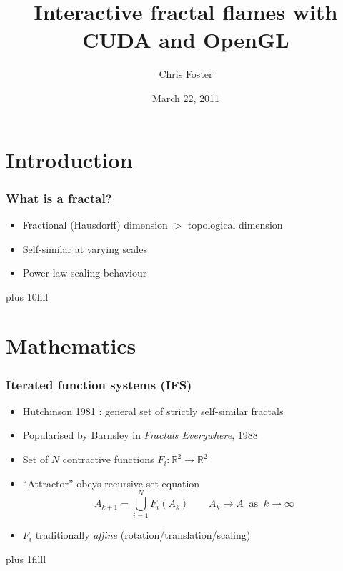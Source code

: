 \documentclass{beamer}
\title[Interactive fractal flames]{Interactive fractal flames with CUDA and OpenGL}
\author{Chris Foster}
\institute{ROAMES}
\date{March 22, 2011}
\newcommand{\vf}[1]{\vskip0pt plus #1}
\begin{document}
\begin{frame}[plain]
  \titlepage
\end{frame}



\section{Introduction}

\begin{frame}
  \frametitle{What is a fractal?}
  \begin{itemize}
    \item<1>
      Fractional (Hausdorff) dimension $>$ topological dimension
    \item<2>
      Self-similar at varying scales
    \item<3>
      Power law scaling behaviour
  \end{itemize}
  \vf{10fill}
\end{frame}



\section{Mathematics}

\begin{frame}
  \frametitle{Iterated function systems (IFS)}
  \begin{itemize}
    \item
      Hutchinson 1981 \cite{Hutchinson1981}: general set of strictly 
      self-similar fractals
    \item
      Popularised by Barnsley \cite{Barnsley1988} in \emph{Fractals Everywhere}, 1988
    \item
      Set of $N$ contractive functions $F_i \colon \mathbb{R}^2\to\mathbb{R}^2$
    \item
      ``Attractor'' obeys recursive set equation
      \[
      A_{k+1} = \bigcup_{i=1}^N F_i(A_k) \qquad
      A_k \to A \;\;\text{as}\;\; k \to \infty
      \]
    \item
      $F_i$ traditionally \emph{affine} (rotation/translation/scaling)
  \end{itemize}
  \vf{1filll}
\end{frame}
\end{document}
